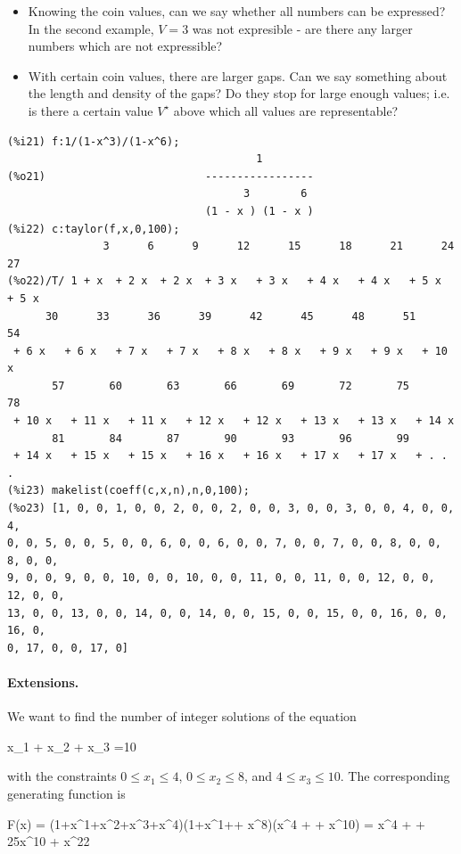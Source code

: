 \begin{itemize}
  \item Knowing the coin values, can we say whether all numbers can be expressed? In the second example, $V=3$ was not expresible - are there any larger numbers which are not expressible?
  \item With certain coin values, there are larger gaps. Can we say something about the length and density of the gaps? Do they stop for large enough values; i.e. is there a certain value $V^\star$ above which all values are representable? 
\end{itemize}

\begin{verbatim}
(%i21) f:1/(1-x^3)/(1-x^6);
                                       1
(%o21)                         -----------------
                                     3        6
                               (1 - x ) (1 - x )
(%i22) c:taylor(f,x,0,100);
               3      6      9      12      15      18      21      24      27
(%o22)/T/ 1 + x  + 2 x  + 2 x  + 3 x   + 3 x   + 4 x   + 4 x   + 5 x   + 5 x
      30      33      36      39      42      45      48      51       54
 + 6 x   + 6 x   + 7 x   + 7 x   + 8 x   + 8 x   + 9 x   + 9 x   + 10 x
       57       60       63       66       69       72       75       78
 + 10 x   + 11 x   + 11 x   + 12 x   + 12 x   + 13 x   + 13 x   + 14 x
       81       84       87       90       93       96       99
 + 14 x   + 15 x   + 15 x   + 16 x   + 16 x   + 17 x   + 17 x   + . . .
(%i23) makelist(coeff(c,x,n),n,0,100);
(%o23) [1, 0, 0, 1, 0, 0, 2, 0, 0, 2, 0, 0, 3, 0, 0, 3, 0, 0, 4, 0, 0, 4, 
0, 0, 5, 0, 0, 5, 0, 0, 6, 0, 0, 6, 0, 0, 7, 0, 0, 7, 0, 0, 8, 0, 0, 8, 0, 0, 
9, 0, 0, 9, 0, 0, 10, 0, 0, 10, 0, 0, 11, 0, 0, 11, 0, 0, 12, 0, 0, 12, 0, 0, 
13, 0, 0, 13, 0, 0, 14, 0, 0, 14, 0, 0, 15, 0, 0, 15, 0, 0, 16, 0, 0, 16, 0, 
0, 17, 0, 0, 17, 0]
\end{verbatim}

\paragraph{Extensions.} We want to find the number of integer solutions of the equation

\bee
x_1 + x_2 + x_3 =10
\eee

with the constraints $0 \leq x_1 \leq 4$, $0 \leq x_2 \leq 8$, and $4 \leq x_3 \leq 10$. The corresponding generating function is

\bee
F(x) = (1+x^1+x^2+x^3+x^4)(1+x^1+\cdots + x^8)(x^4 + \cdots + x^{10}) = x^4 + \cdots + 25x^{10} + \cdots x^{22}
\eee

